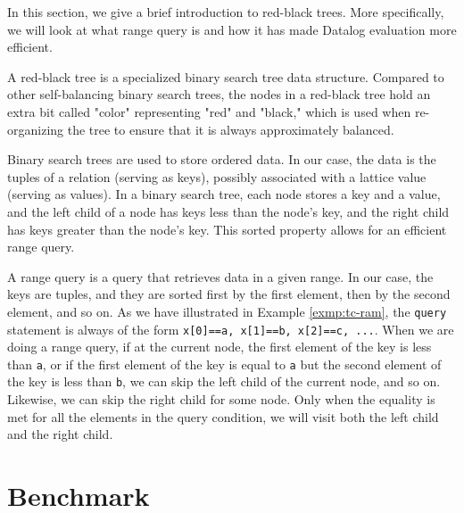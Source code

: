 \documentclass[11pt]{report}
\theoremstyle{definition}
\begin{document}
In this section, we give a brief introduction to red-black trees. More specifically, we will look at what range query is and how it has made Datalog evaluation more efficient.

A red-black tree is a specialized binary search tree data structure. Compared to other self-balancing binary search trees, the nodes in a red-black tree hold an extra bit called "color" representing "red" and "black," which is used when re-organizing the tree to ensure that it is always approximately balanced.

Binary search trees are used to store ordered data. In our case, the data is the tuples of a relation (serving as keys), possibly associated with a lattice value (serving as values). In a binary search tree, each node stores a key and a value, and the left child of a node has keys less than the node's key, and the right child has keys greater than the node's key. This sorted property allows for an efficient range query.

A range query is a query that retrieves data in a given range. In our case, the keys are tuples, and they are sorted first by the first element, then by the second element, and so on. As we have illustrated in Example \ref{exmp:tc-ram}, the \texttt{query} statement is always of the form \texttt{x[0]==a, x[1]==b, x[2]==c, ...}. When we are doing a range query, if at the current node, the first element of the key is less than \texttt{a}, or if the first element of the key is equal to \texttt{a} but the second element of the key is less than \texttt{b}, we can skip the left child of the current node, and so on. Likewise, we can skip the right child for some node. Only when the equality is met for all the elements in the query condition, we will visit both the left child and the right child.

\section{Benchmark}
\label{sec:benchmark}
\end{document}
